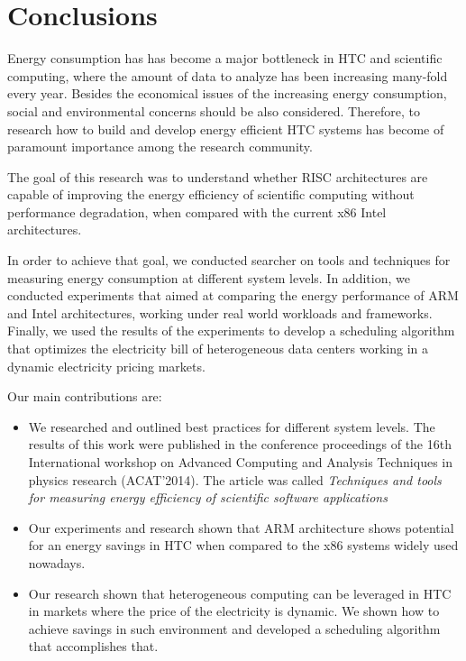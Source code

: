 \chapter{Conclusions}

Energy consumption has has become a major bottleneck in HTC and scientific computing, where the amount of data to analyze has been increasing many-fold every year. Besides the economical issues of the increasing energy consumption, social and environmental concerns should be also considered. Therefore, to research how to build and develop energy efficient HTC systems has become of paramount importance among the research community.

The goal of this research was to understand whether RISC architectures are capable of improving the energy efficiency of scientific computing without performance degradation, when compared with the current x86 Intel architectures.

In order to achieve that goal, we conducted searcher on tools and techniques for measuring energy consumption at different system levels. In addition, we conducted experiments that aimed at comparing the energy performance of ARM and Intel architectures, working under real world workloads and frameworks. Finally, we used the results of the experiments to develop a scheduling algorithm that optimizes the electricity bill of heterogeneous data centers working in a dynamic electricity pricing markets. 

\vspace{5mm}

Our main contributions are: 

\begin{itemize}
  \item We researched and outlined best practices for different system levels. The results of this work were published in the conference proceedings of the 16th International workshop on Advanced Computing and Analysis Techniques in physics research (ACAT'2014). The article was called \textit{Techniques and tools for measuring energy efficiency of scientific software applications}

  \item Our experiments and research shown that ARM architecture shows potential for an energy savings in HTC when compared to the x86 systems widely used nowadays. 

  \item Our research shown that heterogeneous computing can be leveraged in HTC in markets where the price of the electricity is dynamic. We shown how to achieve savings in such environment and developed a scheduling algorithm that accomplishes that.
\end{itemize}
